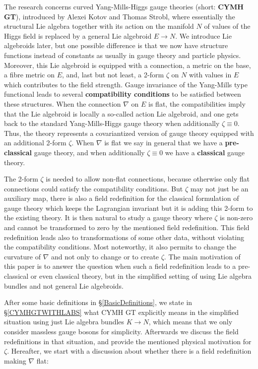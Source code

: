 \documentclass[preprint]{elsarticle}
\theoremstyle{plain}
\theoremstyle{remark}
\theoremstyle{definition}
\begin{document}
The research concerns curved Yang-Mills-Higgs gauge theories (short: \textbf{CYMH GT}), introduced by Alexei Kotov and Thomas Strobl, where essentially the structural Lie algebra together with its action on the manifold $N$ of values of the Higgs field is replaced by a general Lie algebroid $E \to N$. We introduce Lie algebroids later, but one possible difference is that we now have structure functions instead of constants as usually in gauge theory and particle physics. Moreover, this Lie algebroid is equipped with a connection, a metric on the base, a fibre metric on $E$, and, last but not least, a 2-form $\zeta$ on $N$ with values in $E$ which contributes to the field strength. Gauge invariance of the Yang-Mills type functional leads to several \textbf{compatibility conditions} to be satisfied between these structures. When the connection $\nabla$ on $E$ is  flat, the compatibilities imply that the Lie algebroid is locally a so-called action Lie algebroid, and one gets back to the standard Yang-Mills-Higgs gauge theory when additionally $\zeta \equiv 0$. Thus, the theory represents a covariantized version of gauge theory equipped with an additional 2-form $\zeta$. When $\nabla$ is flat we say in general that we have a \textbf{pre-classical} gauge theory, and when additionally $\zeta \equiv 0$ we have a \textbf{classical} gauge theory.

The 2-form $\zeta$ is needed to allow non-flat connections, because otherwise only flat connections could satisfy the compatibility conditions. But $\zeta$ may not just be an auxiliary map, there is also a field redefinition for the classical formulation of gauge theory which keeps the Lagrangian invariant but it is adding this 2-form to the existing theory. It is then natural to study a gauge theory where $\zeta$ is non-zero and cannot be transformed to zero by the mentioned field redefinition. This field redefinition leads also to transformations of some other data, without violating the compatibility conditions. Most noteworthy, it also permits to change the curvature of $\nabla$ and not only to change or to create $\zeta$. The main motivation of this paper is to answer the question when such a field redefinition leads to a pre-classical or even classical theory, but in the simplified setting of using Lie algebra bundles and not general Lie algebroids.

After some basic definitions in \S \ref{BasicDefinitions}, we state in \S \ref{CYMHGTWITHLABS} what CYMH GT explicitly means in the simplified situation using just Lie algebra bundles $K \to N$, which means that we only consider massless gauge bosons for simplicity. Afterwards we discuss the field redefinitions in that situation, and provide the mentioned physical motivation for $\zeta$. Hereafter, we start with a discussion about whether there is a field redefinition making $\nabla$ flat:
\end{document}
